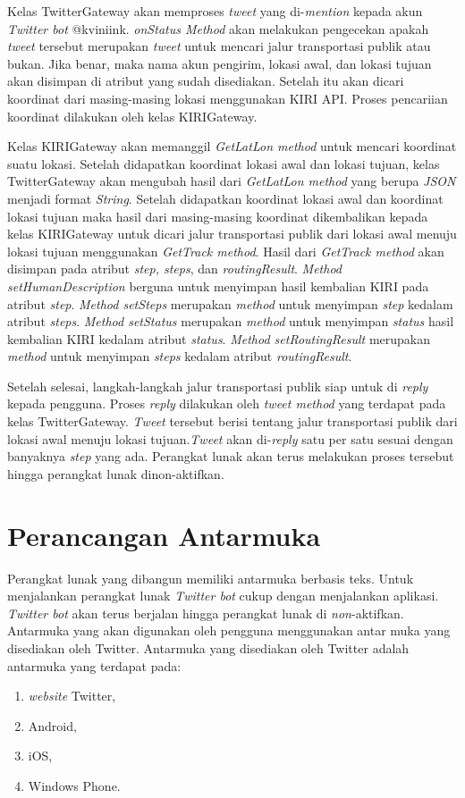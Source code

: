 Kelas TwitterGateway akan memproses \textit{tweet} yang di-\textit{mention} kepada akun \textit{Twitter bot} @kviniink. \textit{onStatus Method} akan melakukan pengecekan apakah \textit{tweet} tersebut merupakan \textit{tweet} untuk mencari jalur transportasi publik atau bukan. Jika benar, maka nama akun pengirim, lokasi awal, dan lokasi tujuan akan disimpan di atribut yang sudah disediakan. Setelah itu akan dicari koordinat dari masing-masing lokasi menggunakan KIRI API. Proses pencariian koordinat dilakukan oleh kelas KIRIGateway.

Kelas KIRIGateway akan memanggil \textit{GetLatLon method} untuk mencari koordinat suatu lokasi. Setelah didapatkan koordinat lokasi awal dan lokasi tujuan, kelas TwitterGateway akan mengubah hasil dari \textit{GetLatLon method} yang berupa \textit{JSON} menjadi format \textit{String}. Setelah didapatkan koordinat lokasi awal dan koordinat lokasi tujuan maka hasil dari masing-masing koordinat dikembalikan kepada kelas KIRIGateway untuk dicari jalur transportasi publik dari lokasi awal menuju lokasi tujuan menggunakan \textit{GetTrack method}. Hasil dari \textit{GetTrack method} akan disimpan pada atribut \textit{step, steps}, dan \textit{routingResult}. \textit{Method setHumanDescription} berguna untuk menyimpan hasil kembalian KIRI pada atribut \textit{step}. \textit{Method setSteps} merupakan \textit{method} untuk menyimpan \textit{step} kedalam atribut \textit{steps}. \textit{Method setStatus} merupakan \textit{method} untuk menyimpan \textit{status} hasil kembalian KIRI kedalam atribut \textit{status}. \textit{Method setRoutingResult} merupakan \textit{method} untuk menyimpan \textit{steps} kedalam atribut \textit{routingResult}.

Setelah selesai, langkah-langkah jalur transportasi publik siap untuk di \textit{reply} kepada pengguna. Proses \textit{reply} dilakukan oleh \textit{tweet method} yang terdapat pada kelas TwitterGateway. \textit{Tweet} tersebut berisi tentang jalur transportasi publik dari lokasi awal menuju lokasi tujuan.\textit{Tweet} akan di-\textit{reply} satu per satu sesuai dengan banyaknya \textit{step} yang ada. Perangkat lunak akan terus melakukan proses tersebut hingga perangkat lunak dinon-aktifkan.

\newpage
\section{Perancangan Antarmuka}
Perangkat lunak yang dibangun memiliki antarmuka berbasis teks. Untuk menjalankan perangkat lunak \textit{Twitter bot} cukup dengan menjalankan aplikasi. \textit{Twitter bot} akan terus berjalan hingga perangkat lunak di \textit{non}-aktifkan. Antarmuka yang akan digunakan oleh pengguna menggunakan antar muka yang disediakan oleh Twitter. Antarmuka yang disediakan oleh Twitter adalah antarmuka yang terdapat pada:
\begin{enumerate}
	\item \textit{website} Twitter,
	\item Android,
	\item iOS,
	\item Windows Phone.
\end{enumerate}

